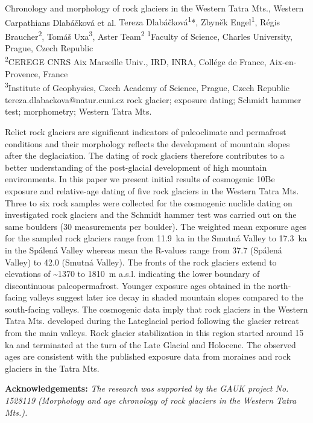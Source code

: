 
\abstract
{Chronology and morphology of rock glaciers in the Western Tatra Mts., Western Carpathians} 
{Dlabáčková et al.} 
{Tereza Dlabáčková\textsuperscript{1}*, Zbyněk Engel\textsuperscript{1}, Régis Braucher\textsuperscript{2}, Tomáš Uxa\textsuperscript{3}, Aster Team\textsuperscript{2}} 
{\POtag} 
{
\textsuperscript{1}Faculty of Science, Charles University, Prague, Czech Republic \\
\textsuperscript{2}CEREGE CNRS Aix Marseille Univ., IRD, INRA, Collége de France, Aix-en-Provence, France\\
\textsuperscript{3}Institute of Geophysics, Czech Academy of Science, Prague, Czech Republic
}
{tereza.dlabackova@natur.cuni.cz}  %
{rock glacier; exposure dating; Schmidt hammer test; morphometry; Western Tatra Mts.}
{Relict rock glaciers are significant indicators of paleoclimate and permafrost conditions and their morphology reflects the development of mountain slopes after the deglaciation. The dating of rock glaciers therefore contributes to a better understanding of the post-glacial development of high mountain environments. In this paper we present initial results of cosmogenic 10Be exposure and relative-age dating of five rock glaciers in the Western Tatra Mts. Three to six rock samples were collected for the cosmogenic nuclide dating on investigated rock glaciers and the Schmidt hammer test was carried out on the same boulders (30 measurements per boulder). The weighted mean exposure ages for the sampled rock glaciers range from 11.9~ka in the Smutná Valley to 17.3~ka in the Spálená Valley whereas mean the R-values range from 37.7 (Spálená Valley) to 42.0 (Smutná Valley). The fronts of the rock glaciers extend to elevations of \textasciitilde1370 to 1810~m a.s.l. indicating the lower boundary of discontinuous paleopermafrost. Younger exposure ages obtained in the north-facing valleys suggest later ice decay in shaded mountain slopes compared to the south-facing valleys. The cosmogenic data imply that rock glaciers in the Western Tatra Mts. developed during the Lateglacial period following the glacier retreat from the main valleys.  Rock glacier stabilization in this region started around 15 ka and terminated at the turn of the Late Glacial and Holocene. The observed ages are consistent with the published exposure data from moraines and rock glaciers in the Tatra Mts.

\vspace{0.5em}
\noindent
\textbf{Acknowledgements:}
\textit{The research was supported by the GAUK project No. 1528119 (Morphology and age chronology of rock glaciers in the Western Tatra Mts.).}
	
}
{
}

